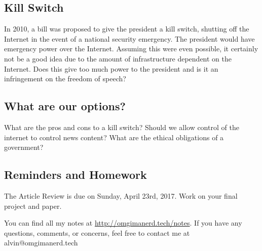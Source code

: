\documentclass[letterpaper, 12pt]{article}
\begin{document}
\subsection*{Kill Switch}
In 2010, a bill was proposed to give the president a kill switch, shutting off
the Internet in the event of a national security emergency. The president
would have emergency power over the Internet. Assuming this were even possible,
it certainly not be a good idea due to the amount of infrastructure dependent on
the Internet. Does this give too much power to the president and is it an
infringement on the freedom of speech?

\subsection*{What are our options?}
What are the pros and cons to a kill switch? Should we allow control of the
internet to control news content? What are the ethical obligations of a
government?

\subsection*{Reminders and Homework}
The Article Review is due on Sunday, April 23rd, 2017.
Work on your final project and paper.

\begin{center}
  You can find all my notes at \url{http://omgimanerd.tech/notes}. If you have
  any questions, comments, or concerns, feel free to contact me at
  alvin@omgimanerd.tech
\end{center}
\end{document}

